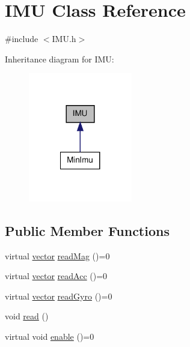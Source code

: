 \hypertarget{class_i_m_u}{\section{\-I\-M\-U \-Class \-Reference}
\label{class_i_m_u}
}


{\ttfamily \#include $<$\-I\-M\-U.\-h$>$}



\-Inheritance diagram for \-I\-M\-U\-:
\nopagebreak
\begin{figure}[H]
\begin{center}
\leavevmode
\includegraphics[width=128pt]{class_i_m_u__inherit__graph}
\end{center}
\end{figure}
\subsection*{\-Public \-Member \-Functions}
\begin{DoxyCompactItemize}
\item 
virtual \hyperlink{vector_8h_a148efcf3c5319dd8961dbf9f4b846a98}{vector} \hyperlink{class_i_m_u_a52359006a1ca04d0b1852f374a476f91}{read\-Mag} ()=0
\item 
virtual \hyperlink{vector_8h_a148efcf3c5319dd8961dbf9f4b846a98}{vector} \hyperlink{class_i_m_u_a2928cc8a1fc13464ef90da96fd9358b7}{read\-Acc} ()=0
\item 
virtual \hyperlink{vector_8h_a148efcf3c5319dd8961dbf9f4b846a98}{vector} \hyperlink{class_i_m_u_a887a00b7e1c998a65ee42b021b59d84c}{read\-Gyro} ()=0
\item 
void \hyperlink{class_i_m_u_a1de4cb31f28f71d7cc8b1546ea59b4ab}{read} ()
\item 
virtual void \hyperlink{class_i_m_u_a58899f2357a00a4d1f3b892b879e1e92}{enable} ()=0
\end{DoxyCompactItemize}
